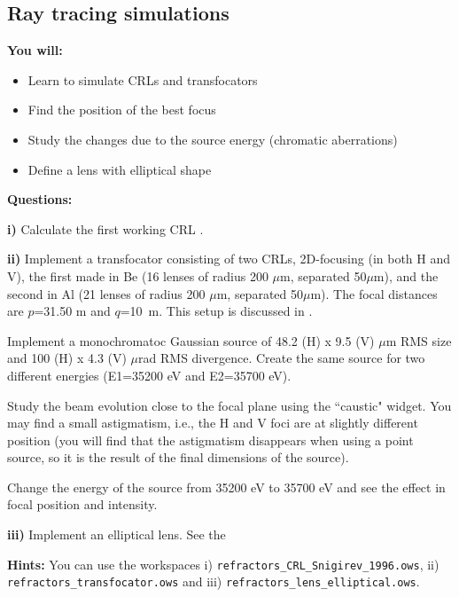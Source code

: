 \subsection{Ray tracing simulations}

\begin{youwillbox}
\textbf{You will:}

\begin{itemize}
    \item Learn to simulate CRLs and transfocators
    \item Find the position of the best focus
    \item Study the changes due to the source energy (chromatic aberrations)
    \item Define a lens with elliptical shape
\end{itemize}
\end{youwillbox}

\begin{questionsbox}
\textbf{Questions:}

\textbf{i)} Calculate the first working CRL \cite{Snigirev1996}.

\textbf{ii)}
Implement a transfocator consisting of two CRLs, 2D-focusing (in both H and V), the first made in Be (16 lenses of radius 200 $\mu$m, separated 50$\mu$m), and the second in Al (21 lenses of radius 200 $\mu$m, separated 50$\mu$m). The focal distances are $p$=31.50 m and $q$=10~m. This setup is discussed in \cite{Baltser2011}.

Implement a monochromatoc Gaussian source of 48.2 (H) x 9.5 (V) $\mu$m RMS size and 100 (H) x 4.3 (V) $\mu$rad RMS divergence. Create the same source for two different energies (E1=35200 eV and E2=35700 eV).

Study the beam evolution close to the focal plane using the ``caustic" widget. You may find a small astigmatism, i.e., the H and V foci are at slightly different position (you will find that the astigmatism disappears when using a point source, so it is the result of the final dimensions of the source).

Change the energy of the source from 35200 eV to 35700 eV and see the effect in focal position and intensity.

\textbf{iii)}
Implement an elliptical lens. See the
\end{questionsbox}

\begin{hintsbox}
\textbf{Hints:} You can use the workspaces i) {\tt refractors\_CRL\_Snigirev\_1996.ows}, ii) {\tt refractors\_transfocator.ows} and iii) {\tt refractors\_lens\_elliptical.ows}.
\end{hintsbox}

